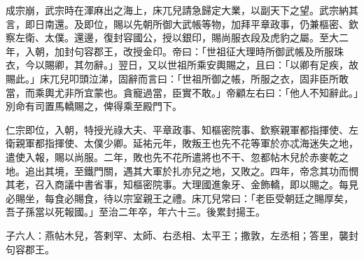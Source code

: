 \begin{pinyinscope}
 成宗崩，武宗時在渾麻出之海上，床兀兒請急歸定大業，以副天下之望。武宗納其言，即日南還。及即位，賜以先朝所御大武帳等物，加拜平章政事，仍兼樞密、欽察左衛、太僕。還邊，復封容國公，授以銀印，賜尚服衣段及虎豹之屬。至大二年，入朝，加封句容郡王，改授金印。帝曰：「世祖征大理時所御武帳及所服珠衣，今以賜卿，其勿辭。」翌日，又以世祖所乘安輿賜之，且曰：「以卿有足疾，故賜此。」床兀兒叩頭泣涕，固辭而言曰：「世祖所御之帳，所服之衣，固非臣所敢當，而乘輿尤非所宜蒙也。貪寵過當，臣實不敢。」帝顧左右曰：「他人不知辭此。」別命有司置馬轎賜之，俾得乘至殿門下。



 仁宗即位，入朝，特授光祿大夫、平章政事、知樞密院事、欽察親軍都指揮使、左衛親軍都指揮使、太僕少卿。延祐元年，敗叛王也先不花等軍於亦忒海迷失之地，遣使入報，賜以尚服。二年，敗也先不花所遣將也不干、忽都帖木兒於赤麥乾之地。追出其境，至鐵門關，遇其大軍於扎亦兒之地，又敗之。四年，帝念其功而憫其老，召入商議中書省事，知樞密院事。大理國進象牙、金飾轎，即以賜之。每見必賜坐，每食必賜食，待以宗室親王之禮。床兀兒常曰：「老臣受朝廷之賜厚矣，吾子孫當以死報國。」至治二年卒，年六十三。後累封揚王。



 子六人：燕帖木兒，答剌罕、太師、右丞相、太平王；撒敦，左丞相；答里，襲封句容郡王。



\end{pinyinscope}
